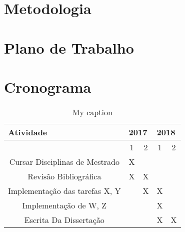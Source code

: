 \documentclass[a4paper,10pt]{article}
\begin{document}
\section{Metodologia}
\section{Plano de Trabalho}



\section{Cronograma}
\begin{table}[]
	\centering
	\caption{My caption}
	\label{my-label}
	\begin{tabular}{|c|c|c|c|c|}
		\hline
		\multicolumn{1}{|l|}{Atividade} & \multicolumn{2}{l|}{2017} & \multicolumn{2}{l|}{2018} \\ \hline
		& 1\degree    & 2\degree    & 1\degree    & 2\degree    \\ \hline
		Cursar Disciplinas de Mestrado  & X           &             &             &             \\ \hline
		Revisão Bibliográfica           & X           & X           &             &             \\ \hline
		Implementação das tarefas X, Y  &             & X           & X           &             \\ \hline
		Implementação de W, Z     &             &             & X           &             \\ \hline
		Escrita Da Dissertação          &             &             & X           & X           \\ \hline
	\end{tabular}
\end{table}



	
	
	
\end{document}

